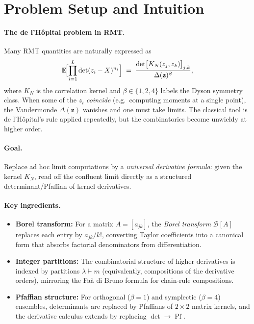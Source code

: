 \documentclass[11pt,a4paper]{article}
\theoremstyle{definition}
\begin{document}
\section{Problem Setup and Intuition}

\paragraph{The de l'H\^opital problem in RMT.}
Many RMT quantities are naturally expressed as
\[
  \mathbb{E}\!\Bigl[\prod_{i=1}^{L}\det(z_i - X)^{n_i}\Bigr]
  \;=\; \frac{\det\bigl[K_N(z_j, z_k)\bigr]_{j,k}}{\Delta(\mathbf{z})^{\beta}},
\]
where $K_N$ is the correlation kernel and $\beta\in\{1,2,4\}$ labels the Dyson symmetry class.
When some of the $z_i$ \emph{coincide} (e.g.\ computing moments at a single point), the Vandermonde $\Delta(\mathbf{z})$ vanishes and one must take limits.  The classical tool is de l'H\^opital's rule applied repeatedly, but the combinatorics become unwieldy at higher order.

\paragraph{Goal.}  Replace ad hoc limit computations by a \emph{universal derivative formula}: given the kernel $K_N$, read off the confluent limit directly as a structured determinant/Pfaffian of kernel derivatives.

\paragraph{Key ingredients.}
\begin{itemize}[nosep]
  \item \textbf{Borel transform:} For a matrix $A = [a_{jk}]$, the \emph{Borel transform} $\mathcal{B}[A]$ replaces each entry by $a_{jk}/k!$, converting Taylor coefficients into a canonical form that absorbs factorial denominators from differentiation.
  \item \textbf{Integer partitions:}  The combinatorial structure of higher derivatives is indexed by partitions $\lambda \vdash m$ (equivalently, compositions of the derivative orders), mirroring the Fa\`a di Bruno formula for chain-rule compositions.
  \item \textbf{Pfaffian structure:}  For orthogonal ($\beta=1$) and symplectic ($\beta=4$) ensembles, determinants are replaced by Pfaffians of $2\times 2$ matrix kernels, and the derivative calculus extends by replacing $\det\to\operatorname{Pf}$.
\end{itemize}
\end{document}
